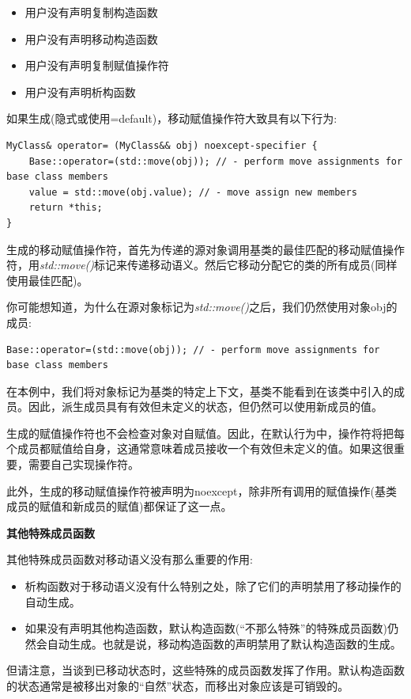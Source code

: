 \begin{itemize}
	\item 用户没有声明复制构造函数
	\item 用户没有声明移动构造函数
	\item 用户没有声明复制赋值操作符
	\item 用户没有声明析构函数
\end{itemize}

如果生成(隐式或使用=default)，移动赋值操作符大致具有以下行为:\par

\begin{lstlisting}[caption={}]
MyClass& operator= (MyClass&& obj) noexcept-specifier {
	Base::operator=(std::move(obj)); // - perform move assignments for base class members
	value = std::move(obj.value); // - move assign new members
	return *this;
}
\end{lstlisting}

生成的移动赋值操作符，首先为传递的源对象调用基类的最佳匹配的移动赋值操作符，用\textit{std::move()}标记来传递移动语义。然后它移动分配它的类的所有成员(同样使用最佳匹配)。\par

你可能想知道，为什么在源对象标记为\textit{std::move()}之后，我们仍然使用对象obj的成员:\par

\begin{lstlisting}[caption={}]
Base::operator=(std::move(obj)); // - perform move assignments for base class members
\end{lstlisting}

在本例中，我们将对象标记为基类的特定上下文，基类不能看到在该类中引入的成员。因此，派生成员具有有效但未定义的状态，但仍然可以使用新成员的值。\par

生成的赋值操作符也不会检查对象对自赋值。因此，在默认行为中，操作符将把每个成员都赋值给自身，这通常意味着成员接收一个有效但未定义的值。如果这很重要，需要自己实现操作符。\par

此外，生成的移动赋值操作符被声明为noexcept，除非所有调用的赋值操作(基类成员的赋值和新成员的赋值)都保证了这一点。\par

\hspace*{\fill} \par %
\textbf{其他特殊成员函数}

其他特殊成员函数对移动语义没有那么重要的作用:\par

\begin{itemize}
	\item 析构函数对于移动语义没有什么特别之处，除了它们的声明禁用了移动操作的自动生成。
	\item 如果没有声明其他构造函数，默认构造函数(“不那么特殊”的特殊成员函数)仍然会自动生成。也就是说，移动构造函数的声明禁用了默认构造函数的生成。
\end{itemize}

但请注意，当谈到已移动状态时，这些特殊的成员函数发挥了作用。默认构造函数的状态通常是被移出对象的“自然”状态，而移出对象应该是可销毁的。\par
















